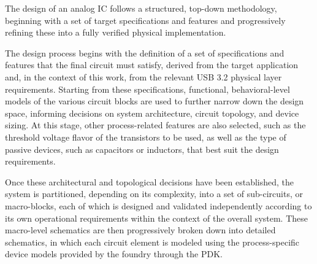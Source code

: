 The design of an analog \ac{IC} follows a structured, top-down methodology, beginning with a set of target specifications and features and progressively refining these into a fully verified physical implementation. %

The design process begins with the definition of a set of specifications and features that the final circuit must satisfy, derived from the target application and, in the context of this work, from the relevant \ac{USB} 3.2 physical layer requirements. Starting from these specifications, functional, behavioral-level models of the various circuit blocks are used to further narrow down the design space, informing decisions on system architecture, circuit topology, and device sizing. At this stage, other process-related features are also selected, such as the threshold voltage flavor of the transistors to be used, as well as the type of passive devices, such as capacitors or inductors, that best suit the design requirements.

Once these architectural and topological decisions have been established, the system is partitioned, depending on its complexity, into a set of sub-circuits, or macro-blocks, each of which is designed and validated independently according to its own operational requirements within the context of the overall system. These macro-level schematics are then progressively broken down into detailed schematics, in which each circuit element is modeled using the process-specific device models provided by the foundry through the \ac{PDK}.

